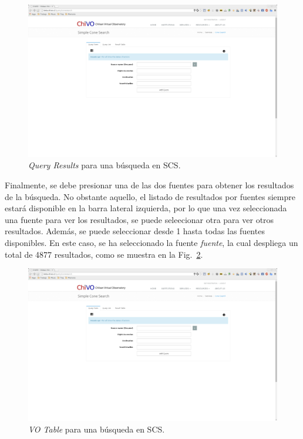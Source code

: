 \begin{figure}[ht!]
    \begin{center}
	\includegraphics[scale=.2]{img/qrscs}
    \end{center}
    \caption{\emph{Query Results} para una búsqueda en SCS.}
    \label{img:qrscs}
\end{figure}

Finalmente, se debe presionar una de las dos fuentes para obtener los
resultados de la búsqueda. No obstante aquello, el listado de
resultados por fuentes siempre estará disponible en la barra lateral
izquierda, por lo que una vez seleccionada una fuente para ver los
resultados, se puede seleecionar otra para ver otros resultados.
Además, se puede seleccionar desde 1 hasta todas las fuentes
disponibles. En este caso, se ha seleccionado la fuente \emph{fuente},
la cual despliega un total de 4877 resultados, como se muestra en la
Fig.~\ref{img:qrscsvot}.

\begin{figure}[ht!]
    \begin{center}
	\includegraphics[scale=.2]{img/qrscsvot}
    \end{center}
    \caption{\emph{VO Table} para una búsqueda en SCS.}
    \label{img:qrscsvot}
\end{figure}



